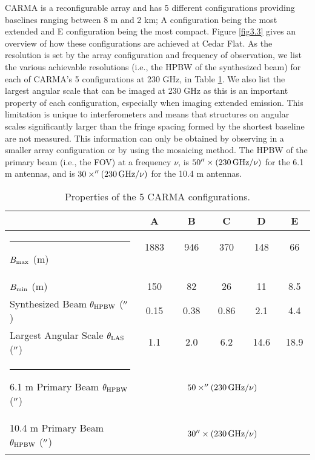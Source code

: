 CARMA is a reconfigurable array and has 5 different configurations providing baselines ranging between 8 m and 2 km; A configuration being the most extended and E configuration being the most compact. Figure \ref{fig3.3} gives an overview of how these configurations are achieved at Cedar Flat. As the resolution is set by the array configuration and frequency of observation, we list the various achievable resolutions (i.e., the HPBW of the synthesized beam) for each of CARMA's 5 configurations at 230 GHz, in Table \ref{tab:3.2}.  We also list the largest angular scale that can be imaged at 230 GHz as this is an important property of each configuration, especially when imaging extended emission. This limitation is unique to interferometers and means that structures on angular scales significantly larger than the fringe spacing formed by the shortest baseline are not measured. This information can only be obtained by observing in a smaller array configuration or by using the mosaicing method. The HPBW of the primary beam (i.e., the FOV) at a frequency $\nu$, is $50^{\prime\prime} \times (230\,\rm{GHz}/\nu)$ for the 6.1 m antennas, and is $30\times  ^{\prime\prime}(230\,\rm{GHz}/\nu)$ for the 10.4 m antennas.

\begin{table}[!t]
\begin{center}
\caption[Properties of the 5 CARMA Array Configurations]
{Properties of the 5 CARMA configurations.}
\begin{tabular}{lccccc}
\hline
\hline
\rule{0pt}{2.5ex} & A & B & C & D & E \\
\hline
\rule{-4.0pt}{2.5ex} $B_{\rm{max}}$ (m) &1883 \ \ & 946 \ \ & 370 \ \ & 148 \ \ & 66 \ \ \\
$B_{\rm{min}}$ (m)& 150& 82& 26& 11& 8.5\\ 
Synthesized Beam $\theta _{\rm{HPBW}}$ ($^{\prime\prime}$)& 0.15& 0.38& 0.86& 2.1& 4.4\\ 
Largest Angular Scale $\theta _{\rm{LAS}}$ ($^{\prime\prime}$) & 1.1& 2.0& 6.2& 14.6& 18.9\\ 
\hline
\rule{-4.0pt}{2.5ex} 6.1 m Primary Beam $\theta _{\rm{HPBW}}$ ($^{\prime\prime}$) & \multicolumn{5}{c}{$50\times ^{\prime\prime}(230\,\rm{GHz}/\nu)$} \\ 
10.4 m Primary Beam $\theta _{\rm{HPBW}}$ ($^{\prime\prime}$) & \multicolumn{5}{c}{$30^{\prime\prime} \times (230\,\rm{GHz}/\nu)$} \\ 
\hline
\rule{0pt}{2.0ex}
\end{tabular}
\label{tab:3.2}
\end{center}
\vspace*{-5mm}
\end{table}

